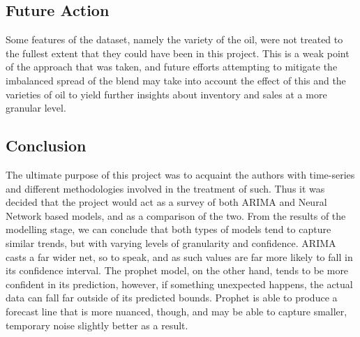 \documentclass{article}
\begin{document}
    \subsection{Future Action}
        Some features of the dataset, namely the variety of the oil, were not treated to the fullest
        extent that they could have been in this project. This is a weak point of the approach that
        was taken, and future efforts attempting to mitigate the imbalanced spread of the blend may
        take into account the effect of this and the varieties of oil to yield further insights
        about inventory and sales at a more granular level.
    \subsection{Conclusion}
        The ultimate purpose of this project was to acquaint the authors with time-series and different
        methodologies involved in the treatment of such. Thus it was decided that the project would
        act as a survey of both ARIMA and Neural Network based models, and as a comparison of the two.
        From the results of the modelling stage, we can conclude that both types of models tend to capture
        similar trends, but with varying levels of granularity and confidence. ARIMA casts a far wider net,
        so to speak, and as such values are far more likely to fall in its confidence interval. The prophet
        model, on the other hand, tends to be more confident in its prediction, however, if something unexpected
        happens, the actual data can fall far outside of its predicted bounds. Prophet is able to produce
        a forecast line that is more nuanced, though, and may be able to capture smaller, temporary noise
        slightly better as a result.
\end{document}
